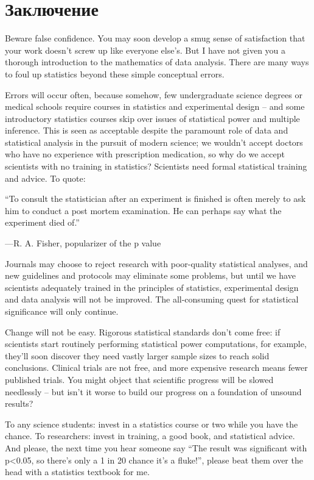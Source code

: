 \chapter*{Заключение}
\label{chp13}


Beware false confidence. You may soon develop a smug sense of satisfaction that your work doesn’t screw up like everyone else’s. But I have not given you a thorough introduction to the mathematics of data analysis. There are many ways to foul up statistics beyond these simple conceptual errors.

Errors will occur often, because somehow, few undergraduate science degrees or medical schools require courses in statistics and experimental design – and some introductory statistics courses skip over issues of statistical power and multiple inference. This is seen as acceptable despite the paramount role of data and statistical analysis in the pursuit of modern science; we wouldn’t accept doctors who have no experience with prescription medication, so why do we accept scientists with no training in statistics? Scientists need formal statistical training and advice. To quote:

    “To consult the statistician after an experiment is finished is often merely to ask him to conduct a post mortem examination. He can perhaps say what the experiment died of.”

    —R. A. Fisher, popularizer of the p value

Journals may choose to reject research with poor-quality statistical analyses, and new guidelines and protocols may eliminate some problems, but until we have scientists adequately trained in the principles of statistics, experimental design and data analysis will not be improved. The all-consuming quest for statistical significance will only continue.

Change will not be easy. Rigorous statistical standards don’t come free: if scientists start routinely performing statistical power computations, for example, they’ll soon discover they need vastly larger sample sizes to reach solid conclusions. Clinical trials are not free, and more expensive research means fewer published trials. You might object that scientific progress will be slowed needlessly – but isn’t it worse to build our progress on a foundation of unsound results?

To any science students: invest in a statistics course or two while you have the chance. To researchers: invest in training, a good book, and statistical advice. And please, the next time you hear someone say “The result was significant with p<0.05, so there’s only a 1 in 20 chance it’s a fluke!”, please beat them over the head with a statistics textbook for me.

